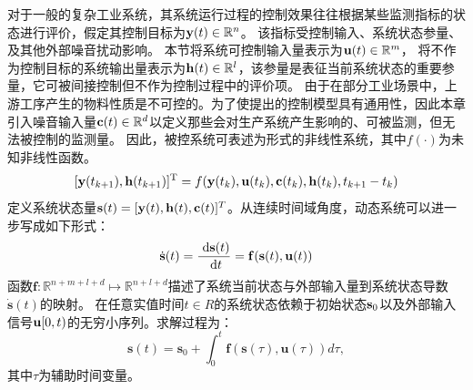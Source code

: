 对于一般的复杂工业系统，其系统运行过程的控制效果往往根据某些监测指标的状态进行评价，假定其控制目标为$\mathbf y(t) \in \mathbb{R}^n$。
该指标受控制输入、系统状态参量、及其他外部噪音扰动影响。
本节将系统可控制输入量表示为$\mathbf u(t) \in \mathbb{R}^m$，
将不作为控制目标的系统输出量表示为$\mathbf h(t) \in \mathbb{R}^l$，该参量是表征当前系统状态的重要参量，它可被间接控制但不作为控制过程中的评价项。
由于在部分工业场景中，上游工序产生的物料性质是不可控的。为了使提出的控制模型具有通用性，因此本章引入噪音输入量$\mathbf c(t) \in\mathbb{R}^d$以定义那些会对生产系统产生影响的、可被监测，但无法被控制的监测量。
因此，被控系统可表述为形式的非线性系统，其中$f
( \cdot )$为未知非线性函数。
\begin{equation}\label{equ:system_dynamic_dt}
    [\mathbf y ( t_{k + 1} ), \mathbf h(t_{k+1})]^{\rm T} = f ( \mathbf y(t_k), \mathbf u ( t_k ) ,\mathbf c ( t_k ) ,\mathbf h(t_k), t_{k+1}-t_k)
\end{equation}
定义系统状态量$\mathbf s(t)=[\mathbf y(t), \mathbf h(t),\mathbf c(t)]^T$。从连续时间域角度，动态系统可以进一步写成如下形式：
\begin{equation}
\dot{\mathbf{s}}(t)=\frac{\mathrm{~d} \mathbf{s}(t)}{\mathrm{~d} t}=\mathbf{f}(\mathbf{s}(t), \mathbf{u}(t))
\end{equation}
函数$\mathbf{f}: \mathbb{R}^{n+m+l+d} \mapsto \mathbb{R}^{n+l+d}$描述了系统当前状态与外部输入量到系统状态导数$\boldsymbol{\dot s}(t)$的映射。
在任意实值时间$t\in R$的系统状态依赖于初始状态$\mathbf s_0$以及外部输入信号$\mathbf u[0,t)$的无穷小序列。求解过程为：
\begin{equation}
\label{equ:system_dynamic_ct}
\mathbf{s}(t)=\mathbf{s}_{0}+\int_{0}^{t} \mathbf{f}(\mathbf{s}(\tau), \mathbf{u}(\tau)) d \tau,
\end{equation}
其中$\tau$为辅助时间变量。

